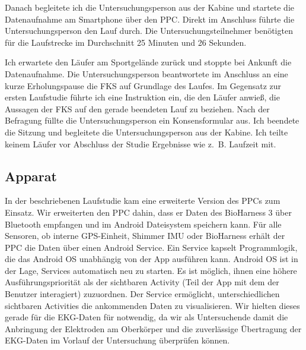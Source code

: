 Danach begleitete ich die Untersuchungsperson aus der Kabine und startete die Datenaufnahme am Smartphone über den \ac{PPC}. Direkt im Anschluss führte die Untersuchungsperson den Lauf durch. Die Untersuchungsteilnehmer benötigten für die Laufstrecke im Durchschnitt 25 Minuten und 26 Sekunden. 

Ich erwartete den Läufer am Sportgelände zurück und stoppte bei Ankunft die Datenaufnahme. Die Untersuchungsperson beantwortete im Anschluss an eine kurze Erholungspause die \ac{FKS} auf Grundlage des Laufes. Im Gegensatz zur ersten Laufstudie führte ich eine Instruktion ein, die den Läufer anwieß, die Aussagen der \ac{FKS} auf den gerade beendeten Lauf zu beziehen. Nach der Befragung füllte die Untersuchungsperson ein Konsensformular aus. Ich beendete die Sitzung und begleitete die Untersuchungsperson aus der Kabine. Ich teilte keinem Läufer vor Abschluss der Studie Ergebnisse wie z.~B. Laufzeit mit. 

\subsection{Apparat} 

\label{sub:apparat}

In der beschriebenen Laufstudie kam eine erweiterte Version des \ac{PPC}s zum Einsatz. Wir erweiterten den \ac{PPC} dahin, dass er Daten des BioHarness 3 über Bluetooth empfangen und im Android Dateisystem speichern kann. Für alle Sensoren, ob interne \acs{GPS}-Einheit, Shimmer \ac{IMU} oder BioHarness erhält der \ac{PPC} die Daten über einen Android Service. Ein Service kapselt Programmlogik, die das Android OS unabhängig von der App ausführen kann. Android OS ist in der Lage, Services automatisch neu zu starten. Es ist möglich, ihnen eine höhere Ausführungspriorität als der sichtbaren Activity (Teil der App mit dem der Benutzer interagiert) zuzuordnen. Der Service ermöglicht, unterschiedlichen sichtbaren Activities die ankommenden Daten zu visualisieren. Wir hielten dieses gerade für die \ac{EKG}-Daten für notwendig, da wir als Untersuchende damit die Anbringung der Elektroden am Oberkörper und die zuverlässige Übertragung der \ac{EKG}-Daten im Vorlauf der Untersuchung überprüfen können. 

